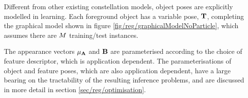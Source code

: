 Different from other existing constellation models, object poses are explicitly modelled in learning. Each foreground object has a variable pose, $\mathbf{T}$, completing the graphical model shown in figure \ref{fig/reg/graphicalModelNoParticle}, which assumes there are $M$ training/test instances. 

The appearance vectors ${\mu_{\mathbf{A}}}$ and $\mathbf{B}$ are parameterised according to the choice of feature descriptor, which is application dependent. The parameterisations of object and feature poses, which are also application dependent, have a large bearing on the tractability of the resulting inference problems, and are discussed in more detail in section \ref{sec/reg/optimisation}. 



